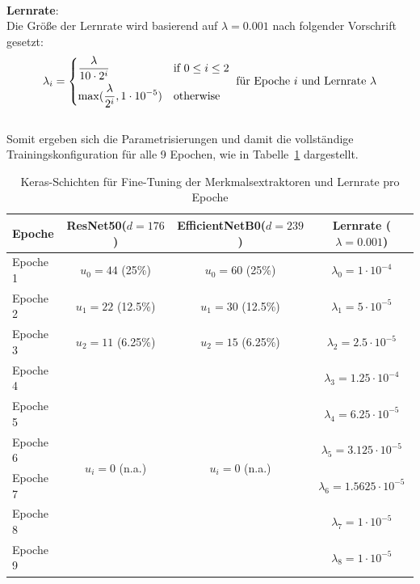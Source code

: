 \documentclass{article}
\newcommand{\resnet}{ResNet50\xspace}
\newcommand{\effnet}{EfficientNetB0\xspace}
\begin{document}
\\[0.5em]
\textbf{Lernrate}:\\
Die Größe der Lernrate wird basierend auf $\lambda=0.001$ nach folgender Vorschrift gesetzt:
\[
    \lambda_i= 
    \begin{dcases}
        \frac{\lambda}{10\cdot 2^i} & \text{if } 0\le i \le 2 \\
        \max(\frac{\lambda}{2^i}, 1\cdot 10^{-5}) & \text{otherwise}
    \end{dcases}
    \text{ für Epoche $i$ und Lernrate $\lambda$}
\]
\\Somit ergeben sich die Parametrisierungen und damit die vollständige Trainingskonfiguration für alle 9 Epochen, wie in Tabelle~\ref{tab:layers} dargestellt.
\begin{table}[!h]
    \centering
    \caption{Keras-Schichten für Fine-Tuning der Merkmalsextraktoren und Lernrate pro Epoche}
    \begin{tabularx}{\textwidth}{|X||c|c||c|}
        \hline
        \textbf{Epoche} & \textbf{\resnet ($d=176$)} & \textbf{\effnet ($d=239$)} & \textbf{Lernrate ($\lambda=0.001$)} \\\hline\hline
        Epoche 1 & $u_0=44$ (25\%) & $u_0=60$ (25\%) & $\lambda_0=1\cdot 10^{-4}$ \\\hline
        Epoche 2 & $u_1=22$ (12.5\%) & $u_1=30$ (12.5\%) & $\lambda_1=5\cdot 10^{-5}$ \\\hline
        Epoche 3 & $u_2=11$ (6.25\%) & $u_2=15$ (6.25\%) & $\lambda_2=2.5\cdot 10^{-5}$ \\\hline
        Epoche 4 & \multirow{6}{*}{$u_i=0$ (n.a.)} & \multirow{6}{*}{$u_i=0$ (n.a.)} & $\lambda_3=1.25\cdot 10^{-4}$ \\\cline{1-1}\cline{4-4}
        Epoche 5 &  &  & $\lambda_4=6.25\cdot 10^{-5}$ \\\cline{1-1}\cline{4-4}
        Epoche 6 &  &  & $\lambda_5=3.125\cdot 10^{-5}$ \\\cline{1-1}\cline{4-4}
        Epoche 7 &  &  & $\lambda_6=1.5625\cdot 10^{-5}$ \\\cline{1-1}\cline{4-4}
        Epoche 8 &  &  & $\lambda_7=1\cdot 10^{-5}$ \\\cline{1-1}\cline{4-4}
        Epoche 9 &  &  & $\lambda_8=1\cdot 10^{-5}$ \\\hline
    \end{tabularx}
    \label{tab:layers}
\end{table}
\end{document}
